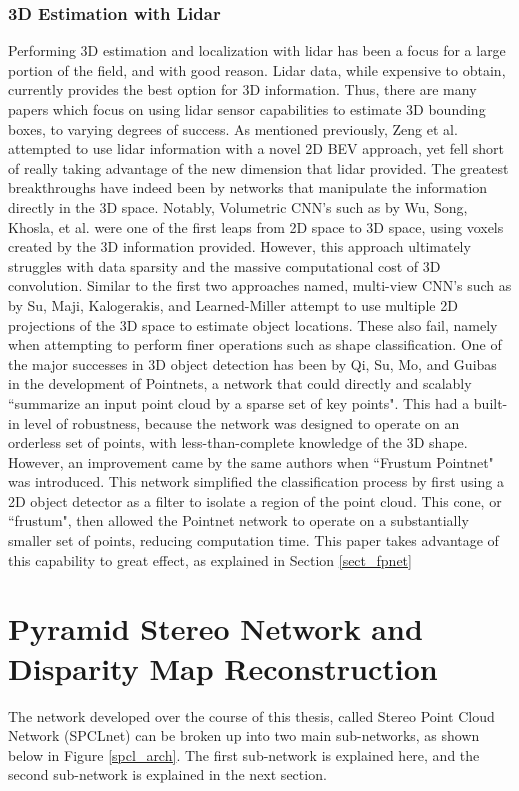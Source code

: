 \subsubsection{3D Estimation with Lidar}
Performing 3D estimation and localization with lidar has been a focus for a large portion of the field, and with good reason. Lidar data, while expensive to obtain, currently provides the best option for 3D information. Thus, there are many papers which focus on using lidar sensor capabilities to estimate 3D bounding boxes, to varying degrees of success. As mentioned previously, Zeng et al. \cite{zeng2018rt3d} attempted to use lidar information with a novel 2D BEV approach, yet fell short of really taking advantage of the new dimension that lidar provided. The greatest breakthroughs have indeed been by networks that manipulate the information directly in the 3D space. Notably, Volumetric CNN's such as by Wu, Song, Khosla, et al. \cite{wu20153d} were one of the first leaps from 2D space to 3D space, using voxels created by the 3D information provided. However, this approach ultimately struggles with data sparsity and the massive computational cost of 3D convolution. Similar to the first two approaches named, multi-view CNN's such as by Su, Maji, Kalogerakis, and Learned-Miller \cite{su2015multi} attempt to use multiple 2D projections of the 3D space to estimate object locations. These also fail, namely when attempting to perform finer operations such as shape classification. One of the major successes in 3D object detection has been by Qi, Su, Mo, and Guibas \cite{qi_pointnet:_2017} in the development of Pointnets, a network that could directly and scalably ``summarize an input point cloud by a sparse set of key points". This had a built-in level of robustness, because the network was designed to operate on an orderless set of points, with less-than-complete knowledge of the 3D shape. However, an improvement came by the same authors when ``Frustum Pointnet" \cite{qi_frustum_2017} was introduced. This network simplified the classification process by first using a 2D object detector as a filter to isolate a region of the point cloud. This cone, or ``frustum", then allowed the Pointnet network to operate on a substantially smaller set of points, reducing computation time. This paper takes advantage of this capability to great effect, as explained in Section \ref{sect_fpnet}

\newpage
\section{Pyramid Stereo Network and Disparity Map Reconstruction} %
\label{sect_psmnet}
The network developed over the course of this thesis, called Stereo Point Cloud Network (SPCLnet) can be broken up into two main sub-networks, as shown below in Figure \ref{spcl_arch}. The first sub-network is explained here, and the second sub-network is explained in the next section.

